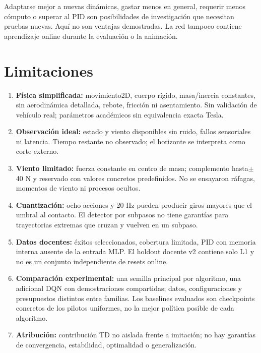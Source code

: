 \documentclass[12pt,a4paper]{article}
\begin{document}
\endgroup
Adaptarse mejor a nuevas dinámicas,\allowbreak{} gastar menos en general,\allowbreak{} requerir menos cómputo o superar al PID son posibilidades de investigación que necesitan pruebas nuevas. Aquí no son ventajas demostradas. La red tampoco contiene aprendizaje online durante la evaluación o la animación.



\section{Limitaciones}
\begin{enumerate}
\item \textbf{Física simplificada:} movimiento2D,\allowbreak{} cuerpo rígido,\allowbreak{} masa/\allowbreak{}inercia constantes,\allowbreak{} sin aerodinámica detallada,\allowbreak{} rebote,\allowbreak{} fricción ni asentamiento. Sin validación de vehículo real; parámetros académicos sin equivalencia exacta Tesla.
\item \textbf{Observación ideal:} estado y viento disponibles sin ruido,\allowbreak{} fallos sensoriales ni latencia. Tiempo restante no observado; el horizonte se interpreta como corte externo.
\item \textbf{Viento limitado:} fuerza constante en centro de masa; complemento hasta\ensuremath{\pm}40 N y reservado con valores concretos predefinidos. No se ensayaron ráfagas,\allowbreak{} momentos de viento ni procesos ocultos.
\item \textbf{Cuantización:} ocho acciones y 20 Hz pueden producir giros mayores que el umbral al contacto. El detector por subpasos no tiene garantías para trayectorias extremas que cruzan y vuelven en un subpaso.
\item \textbf{Datos docentes:} éxitos seleccionados,\allowbreak{} cobertura limitada,\allowbreak{} PID con memoria interna ausente de la entrada MLP. El holdout docente v2 contiene solo L1 y no es un conjunto independiente de resets online.
\item \textbf{Comparación experimental:} una semilla principal por algoritmo,\allowbreak{} una adicional DQN con demostraciones compartidas; datos,\allowbreak{} configuraciones y presupuestos distintos entre familias. Los baselines evaluados son checkpoints concretos de los pilotos uniformes,\allowbreak{} no la mejor política posible de cada algoritmo.
\item \textbf{Atribución:} contribución TD no aislada frente a imitación; no hay garantías de convergencia,\allowbreak{} estabilidad,\allowbreak{} optimalidad o generalización.

\end{enumerate}
\end{document}
